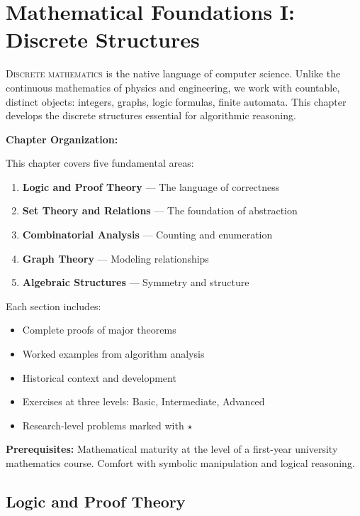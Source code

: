 \chapter{Mathematical Foundations I: Discrete Structures}
\label{ch:discrete-foundations}

\lettrine[lines=3]{D}{iscrete mathematics} is the native language of computer 
science. Unlike the continuous mathematics of physics and engineering, we work 
with countable, distinct objects: integers, graphs, logic formulas, finite 
automata. This chapter develops the discrete structures essential for 
algorithmic reasoning.

\begin{chapterintro}
\textbf{Chapter Organization:}

This chapter covers five fundamental areas:
\begin{enumerate}[noitemsep]
    \item \textbf{Logic and Proof Theory} — The language of correctness
    \item \textbf{Set Theory and Relations} — The foundation of abstraction
    \item \textbf{Combinatorial Analysis} — Counting and enumeration
    \item \textbf{Graph Theory} — Modeling relationships
    \item \textbf{Algebraic Structures} — Symmetry and structure
\end{enumerate}

Each section includes:
\begin{itemize}[noitemsep]
    \item Complete proofs of major theorems
    \item Worked examples from algorithm analysis
    \item Historical context and development
    \item Exercises at three levels: Basic, Intermediate, Advanced
    \item Research-level problems marked with $\star$
\end{itemize}

\textbf{Prerequisites:} Mathematical maturity at the level of a first-year 
university mathematics course. Comfort with symbolic manipulation and logical 
reasoning.
\end{chapterintro}

\section{Logic and Proof Theory}
\label{sec:logic-proof}

